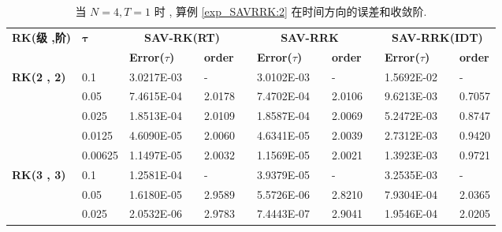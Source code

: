 	
\begin{table}[H]\scriptsize
\centering
\caption{当 $N=4 , T = 1$ 时 , 算例 \ref{exp_SAVRRK:2}  在时间方向的误差和收敛阶.}
\begin{tabular}{lllllrlrlrlrlrl}
\toprule
\multicolumn{2}{l}{\multirow{2}[3]{*}{\textbf{RK(级 ,阶)}}} & \multicolumn{2}{l}{\multirow{2}[3]{*}{$\bm{\tau}$}} & \multicolumn{3}{c}{\textbf{SAV-RK(RT)}} &       & \multicolumn{3}{c}{\textbf{SAV-RRK}} &       & \multicolumn{3}{c}{\textbf{SAV-RRK(IDT)}} \\
\cmidrule{5-7}\cmidrule{9-11}\cmidrule{13-15}    \multicolumn{2}{l}{} & \multicolumn{2}{l}{} & \textbf{Error($\tau$)} &       & \textbf{order} &       & \textbf{Error($\tau$)} &       & \textbf{order} &       & \textbf{Error($\tau$)} &       & \textbf{order} \\
\hline
\multicolumn{2}{l}{\multirow{5}[0]{*}{\textbf{RK(2 , 2)}}} & \multicolumn{2}{l}{0.1} & 3.0217E-03 &       & -     &       & 3.0102E-03 &       & -     &       & 1.5692E-02 &       & - \\
\multicolumn{2}{l}{} & \multicolumn{2}{l}{0.05} & 7.4615E-04 &       & 2.0178  &       & 7.4702E-04 &       & 2.0106  &       & 9.6213E-03 &       & 0.7057  \\
\multicolumn{2}{l}{} & \multicolumn{2}{l}{0.025} & 1.8513E-04 &       & 2.0109  &       & 1.8587E-04 &       & 2.0069  &       & 5.2472E-03 &       & 0.8747  \\
\multicolumn{2}{l}{} & \multicolumn{2}{l}{0.0125} & 4.6090E-05 &       & 2.0060  &       & 4.6341E-05 &       & 2.0039  &       & 2.7312E-03 &       & 0.9420  \\
\multicolumn{2}{l}{} & \multicolumn{2}{l}{0.00625} & 1.1497E-05 &       & 2.0032  &       & 1.1569E-05 &       & 2.0021  &       & 1.3923E-03 &       & 0.9721  \\
\multicolumn{2}{l}{\multirow{5}[0]{*}{\textbf{RK(3 , 3)}}} & \multicolumn{2}{l}{0.1} & 1.2581E-04 &       & -     &       & 3.9379E-05 &       & -     &       & 3.2535E-03 &       & - \\
\multicolumn{2}{l}{} & \multicolumn{2}{l}{0.05} & 1.6180E-05 &       & 2.9589  &       & 5.5726E-06 &       & 2.8210  &       & 7.9304E-04 &       & 2.0365  \\
\multicolumn{2}{l}{} & \multicolumn{2}{l}{0.025} & 2.0532E-06 &       & 2.9783  &       & 7.4443E-07 &       & 2.9041  &       & 1.9546E-04 &       & 2.0205  \\

\end{tabular}
\end{table}

